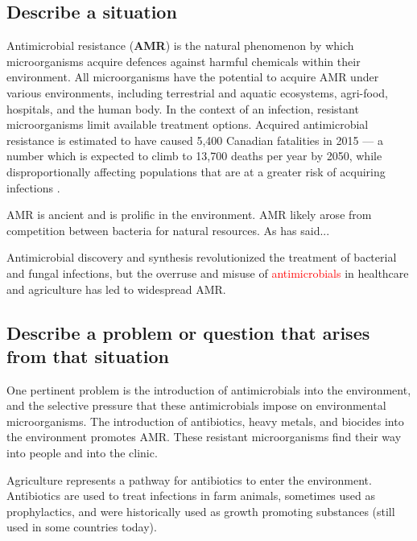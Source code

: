 \subsection{Describe a situation}

Antimicrobial resistance (\textbf{AMR}) is the natural phenomenon by which microorganisms acquire defences against harmful chemicals within their environment.
All microorganisms have the potential to acquire AMR under various environments, including terrestrial and aquatic ecosystems, agri-food, hospitals, and the human body.
In the context of an infection, resistant microorganisms limit available treatment options.
Acquired antimicrobial resistance is estimated to have caused 5,400 Canadian fatalities in 2015 — a number which is expected to climb to 13,700 deaths per year by 2050, while disproportionally affecting populations that are at a greater risk of acquiring infections \parencite{councilofcanadianacademiesWhenAntibioticsFail2019}.

AMR is ancient and is prolific in the environment.
AMR likely arose from competition between bacteria for natural resources.
As \textcite{buongerminopereiraComprehensiveSurveyIntegronassociated2020} has said...

Antimicrobial discovery and synthesis revolutionized the treatment of bacterial and fungal infections, but the overruse and misuse of \textcolor{red}{antimicrobials} in healthcare and agriculture has led to widespread AMR.

\subsection{Describe a problem or question that arises from that situation}

One pertinent problem is the introduction of antimicrobials into the environment, and the selective pressure that these antimicrobials impose on environmental microorganisms.
The introduction of antibiotics, heavy metals, and biocides into the environment promotes AMR.
These resistant microorganisms find their way into people and into the clinic.

Agriculture represents a pathway for antibiotics to enter the environment.
Antibiotics are used to treat infections in farm animals, sometimes used as prophylactics, and were historically used as growth promoting substances (still used in some countries today).

